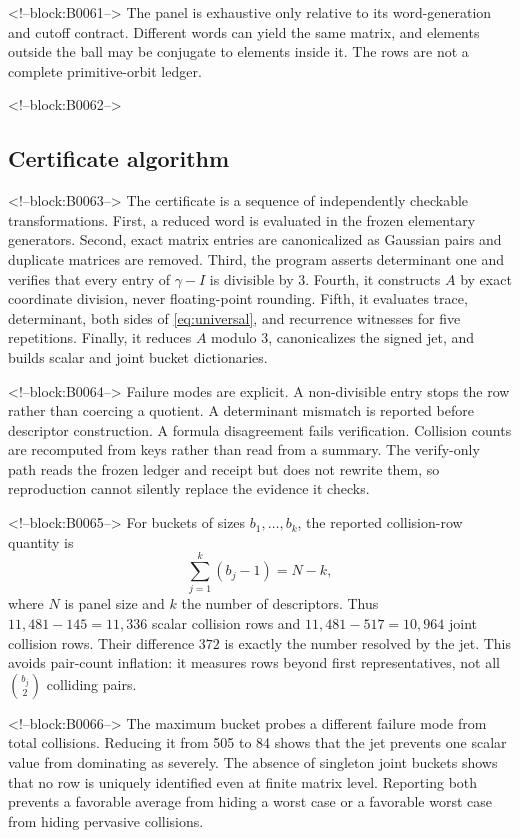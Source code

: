 \documentclass[11pt,a4paper]{article}
\theoremstyle{definition}
\theoremstyle{remark}
\begin{document}
<!--block:B0061-->
The panel is exhaustive only relative to its word-generation and cutoff contract. Different words can yield the same matrix, and elements outside the ball may be conjugate to elements inside it. The rows are not a complete primitive-orbit ledger.

<!--block:B0062-->
\subsection{Certificate algorithm}

<!--block:B0063-->
The certificate is a sequence of independently checkable transformations. First, a reduced word is evaluated in the frozen elementary generators. Second, exact matrix entries are canonicalized as Gaussian pairs and duplicate matrices are removed. Third, the program asserts determinant one and verifies that every entry of \(\gamma-I\) is divisible by \(3\). Fourth, it constructs \(A\) by exact coordinate division, never floating-point rounding. Fifth, it evaluates trace, determinant, both sides of \cref{eq:universal}, and recurrence witnesses for five repetitions. Finally, it reduces \(A\) modulo \(3\), canonicalizes the signed jet, and builds scalar and joint bucket dictionaries.

<!--block:B0064-->
Failure modes are explicit. A non-divisible entry stops the row rather than coercing a quotient. A determinant mismatch is reported before descriptor construction. A formula disagreement fails verification. Collision counts are recomputed from keys rather than read from a summary. The verify-only path reads the frozen ledger and receipt but does not rewrite them, so reproduction cannot silently replace the evidence it checks.

<!--block:B0065-->
For buckets of sizes \(b_1,\ldots,b_k\), the reported collision-row quantity is
\[
 \sum_{j=1}^k(b_j-1)=N-k,
\]
where \(N\) is panel size and \(k\) the number of descriptors. Thus \(11{,}481-145=11{,}336\) scalar collision rows and \(11{,}481-517=10{,}964\) joint collision rows. Their difference \(372\) is exactly the number resolved by the jet. This avoids pair-count inflation: it measures rows beyond first representatives, not all \(\binom{b_j}{2}\) colliding pairs.

<!--block:B0066-->
The maximum bucket probes a different failure mode from total collisions. Reducing it from 505 to 84 shows that the jet prevents one scalar value from dominating as severely. The absence of singleton joint buckets shows that no row is uniquely identified even at finite matrix level. Reporting both prevents a favorable average from hiding a worst case or a favorable worst case from hiding pervasive collisions.
\end{document}
